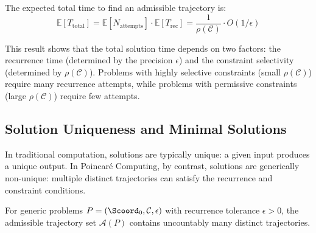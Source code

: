 \begin{corollary}
\label{cor:total_solution_time}
The expected total time to find an admissible trajectory is:
\begin{equation}
\mathbb{E}[T_{\text{total}}] = \mathbb{E}[N_{\text{attempts}}] \cdot \mathbb{E}[T_{\text{rec}}] = \frac{1}{\rho(\mathcal{C})} \cdot O(1/\epsilon)
\label{eq:total_solution_time}
\end{equation}
\end{corollary}

This result shows that the total solution time depends on two factors: the recurrence time (determined by the precision $\epsilon$) and the constraint selectivity (determined by $\rho(\mathcal{C})$). Problems with highly selective constraints (small $\rho(\mathcal{C})$) require many recurrence attempts, while problems with permissive constraints (large $\rho(\mathcal{C})$) require few attempts.

\subsection{Solution Uniqueness and Minimal Solutions}

In traditional computation, solutions are typically unique: a given input produces a unique output. In Poincaré Computing, by contrast, solutions are generically non-unique: multiple distinct trajectories can satisfy the recurrence and constraint conditions.

\begin{theorem}
\label{thm:non_uniqueness}
For generic problems $P = (\Scoord_0, \mathcal{C}, \epsilon)$ with recurrence tolerance $\epsilon > 0$, the admissible trajectory set $\mathcal{A}(P)$ contains uncountably many distinct trajectories.
\end{theorem}

